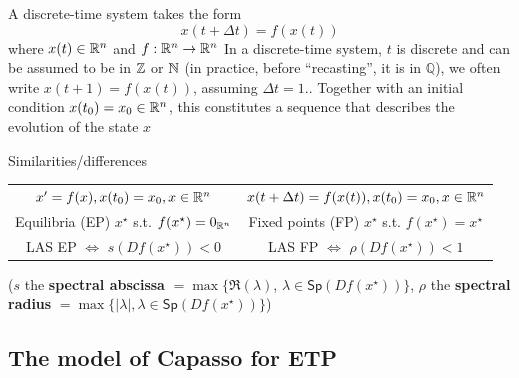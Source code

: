 \documentclass[aspectratio=169]{beamer}
\begin{document}
\begin{frame}
  A discrete-time system takes the form
  \begin{equation}\label{eq:DTS}
    x(t+\Delta t) = f(x(t))
  \end{equation}
  where $x(t)\in\mathbb{R}^n$ and $f:\mathbb{R}^n\to\mathbb{R}^n$
  \vfill
  In a discrete-time system, $t$ is discrete and can be assumed to be in $\mathbb{Z}$ or $\mathbb{N}$ (in practice, before ``recasting'', it is in $\mathbb{Q}$), we often write $x(t+1)=f(x(t))$, assuming $\Delta t=1$..
  \vfill
  Together with an initial condition $x(t_0)=x_0\in\mathbb{R}^n$, this constitutes a sequence that describes the evolution of the state $x$
\end{frame}

\begin{frame}{Similarities/differences}
  \begin{center}
    \renewcommand{\arraystretch}{1.5}
    \begin{tabular}{cc}
      $x'=f(x), x(t_0)=x_0, x\in\mathbb{R}^n$
      &
      $x(t+\Delta t)=f(x(t)), x(t_0)=x_0, x\in\mathbb{R}^n$ \\
      Equilibria (EP) $x^\star$ s.t. $f(x^\star)=0_{\mathbb{R}^n}$ 
      &
      Fixed points (FP) $x^\star$ s.t. $f(x^\star)=x^\star$ \\
      LAS EP $\Leftrightarrow$ $s(Df(x^\star))<0$
      &
      LAS FP $\Leftrightarrow$ $\rho(Df(x^\star))<1$ \\
      
    \end{tabular}    
  \end{center}
  \vfill
  ($s$ the \textbf{spectral abscissa} $=\max\{\Re(\lambda)$, $\lambda\in\mathsf{Sp}(Df(x^\star))\}$, $\rho$ the \textbf{spectral radius} $=\max\{|\lambda|,\lambda\in\mathsf{Sp}(Df(x^\star))\}$)
\end{frame}

\subsection{The model of Capasso for ETP}
\end{document}
